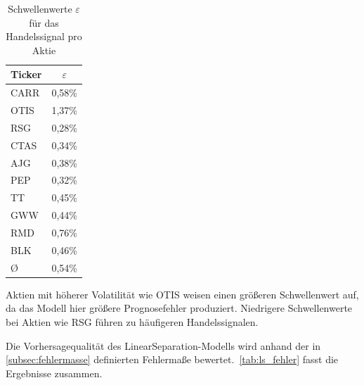 \begin{table}[htbp]
    \centering
    \begin{tabular}{l c}
        \toprule
        Ticker & $\varepsilon$ \\
        \midrule
        CARR   & 0,58\%        \\
        OTIS   & 1,37\%        \\
        RSG    & 0,28\%        \\
        CTAS   & 0,34\%        \\
        AJG    & 0,38\%        \\
        PEP    & 0,32\%        \\
        TT     & 0,45\%        \\
        GWW    & 0,44\%        \\
        RMD    & 0,76\%        \\
        BLK    & 0,46\%        \\
        \midrule
        \O     & 0,54\%        \\
        \bottomrule
    \end{tabular}
    \caption{Schwellenwerte $\varepsilon$ für das Handelssignal pro Aktie}\label{tab:ls_epsilon}
\end{table}

Aktien mit höherer Volatilität wie OTIS weisen einen größeren Schwellenwert auf, da das Modell hier größere Prognosefehler produziert. Niedrigere Schwellenwerte bei Aktien wie RSG führen zu häufigeren Handelssignalen.

Die Vorhersagequalität des LinearSeparation-Modells wird anhand der in \cref{subsec:fehlermasse} definierten Fehlermaße bewertet.~\cref{tab:ls_fehler} fasst die Ergebnisse zusammen.

